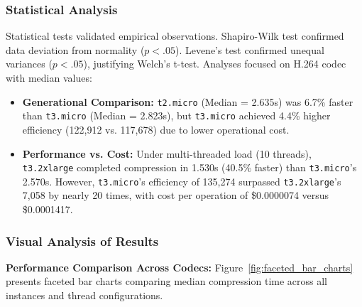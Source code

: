 \documentclass[conference]{IEEEtran}
\begin{document}
	\subsubsection{Statistical Analysis}
	
	Statistical tests validated empirical observations. Shapiro-Wilk test confirmed data deviation from normality ($p < .05$). Levene's test confirmed unequal variances ($p < .05$), justifying Welch's t-test. Analyses focused on H.264 codec with median values:
	
	\begin{itemize}
		\item \textbf{Generational Comparison:} \texttt{t2.micro} (Median = 2.635s) was 6.7\% faster than \texttt{t3.micro} (Median = 2.823s), but \texttt{t3.micro} achieved 4.4\% higher efficiency (122,912 vs. 117,678) due to lower operational cost.
		
		\item \textbf{Performance vs. Cost:} Under multi-threaded load (10 threads), \texttt{t3.2xlarge} completed compression in 1.530s (40.5\% faster) than \texttt{t3.micro}'s 2.570s. However, \texttt{t3.micro}'s efficiency of 135,274 surpassed \texttt{t3.2xlarge}'s 7,058 by nearly 20 times, with cost per operation of \$0.0000074 versus \$0.0001417.
	\end{itemize}
	
	\subsubsection{Visual Analysis of Results}
	
	\textbf{Performance Comparison Across Codecs:} Figure~\ref{fig:faceted_bar_charts} presents faceted bar charts comparing median compression time across all instances and thread configurations.
	
\end{document}
